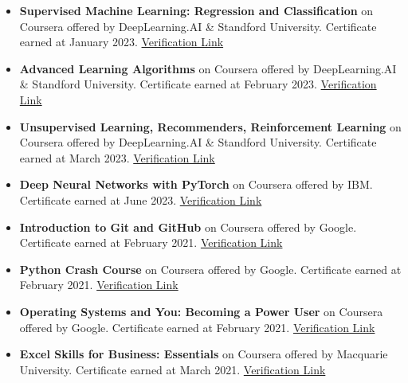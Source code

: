 \documentclass[letterpaper, 12pt]{article}
\begin{document}
	\begin{itemize}[leftmargin=*]

	\item \textbf{Supervised Machine Learning: Regression and Classification} on Coursera offered by DeepLearning.AI \& Standford University. Certificate earned at January 2023. \href{https://www.coursera.org/account/accomplishments/certificate/VD8VT99H89J5}{Verification Link}

	\item \textbf{Advanced Learning Algorithms} on Coursera offered by DeepLearning.AI \& Standford University. Certificate earned at February 2023. \href{https://www.coursera.org/account/accomplishments/certificate/7PRNGGJZ7YBR}{Verification Link}

	\item \textbf{Unsupervised Learning, Recommenders, Reinforcement Learning} on Coursera offered by DeepLearning.AI \& Standford University. Certificate earned at March 2023. \href{https://www.coursera.org/account/accomplishments/certificate/CTH6L4SBUL7S}{Verification Link}

	\item \textbf{Deep Neural Networks with PyTorch} on Coursera offered by IBM. Certificate earned at June 2023. \href{https://www.coursera.org/account/accomplishments/certificate/VW9E3WQXYPJ9}{Verification Link}

	\item \textbf{Introduction to Git and GitHub} on Coursera offered by Google. Certificate earned at February 2021. \href{https://www.coursera.org/account/accomplishments/certificate/3H3N24N688CQ}{Verification Link}

	\item \textbf{Python Crash Course} on Coursera offered by Google. Certificate earned at February 2021. \href{https://www.coursera.org/account/accomplishments/certificate/ULTQVPQLDMZU}{Verification Link}

	\item \textbf{Operating Systems and You: Becoming a Power User} on Coursera offered by Google. Certificate earned at February 2021. \href{https://www.coursera.org/account/accomplishments/certificate/3N5CTQHU47X3}{Verification Link}

	\item \textbf{Excel Skills for Business: Essentials} on Coursera offered by Macquarie University. Certificate earned at March 2021. \href{https://www.coursera.org/account/accomplishments/certificate/7DPNK2A4CHMX}{Verification Link}

	\end{itemize}
\end{document}
